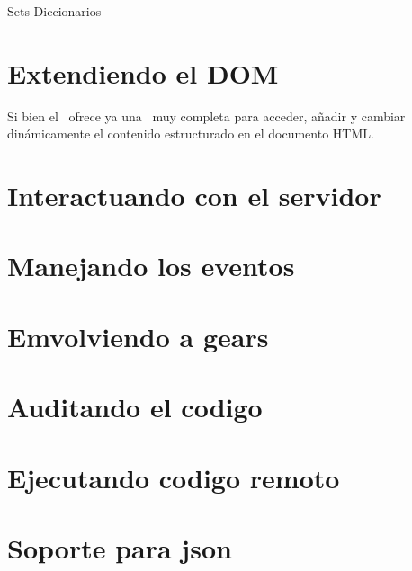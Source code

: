 Sets
Diccionarios

%   
%   
%   
\section{Extendiendo el DOM}
Si bien el \DOM\ ofrece ya una \API\ muy completa para acceder, añadir y cambiar
dinámicamente el contenido estructurado en el documento HTML.

\section{Interactuando con el servidor}

\section{Manejando los eventos}

\section{Emvolviendo a gears}

\section{Auditando el codigo}

\section{Ejecutando codigo remoto}

\section{Soporte para json}
